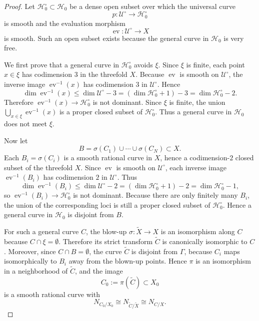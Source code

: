 \documentclass[11pt]{article}
\theoremstyle{definition}
\newcommand{\ev}{\operatorname{ev}}      %
\begin{document}
\begin{proof}
Let $\mathcal H_0^\circ\subset \mathcal H_0$ be a dense open subset over which the
universal curve
\[
p:\mathcal U^\circ\to \mathcal H_0^\circ
\]
is smooth and the evaluation morphism
\[
\ev:\mathcal U^\circ\to X
\]
is smooth. Such an open subset exists because the general curve in
$\mathcal H_0$ is very free.

We first prove that a general curve in $\mathcal H_0^\circ$ avoids $\xi$.
Since $\xi$ is finite, each point $x\in \xi$ has codimension $3$ in the
threefold $X$. Because $\ev$ is smooth on $\mathcal U^\circ$, the inverse image
$\ev^{-1}(x)$ has codimension $3$ in $\mathcal U^\circ$. Hence
\[
\dim \ev^{-1}(x)\le \dim \mathcal U^\circ-3
= (\dim \mathcal H_0^\circ+1)-3
= \dim \mathcal H_0^\circ-2.
\]
Therefore $\ev^{-1}(x)\to \mathcal H_0^\circ$ is not dominant. Since $\xi$ is
finite, the union $\bigcup_{x\in \xi}\ev^{-1}(x)$ is a proper closed subset of
$\mathcal H_0^\circ$. Thus a general curve in $\mathcal H_0$ does not meet
$\xi$.

Now let
\[
B=\sigma(C_1)\cup\cdots\cup\sigma(C_N)\subset X.
\]
Each $B_i=\sigma(C_i)$ is a smooth rational curve in $X$, hence a
codimension-$2$ closed subset of the threefold $X$. Since $\ev$ is smooth on
$\mathcal U^\circ$, each inverse image $\ev^{-1}(B_i)$ has codimension $2$ in
$\mathcal U^\circ$. Thus
\[
\dim \ev^{-1}(B_i)\le \dim \mathcal U^\circ-2
= (\dim \mathcal H_0^\circ+1)-2
= \dim \mathcal H_0^\circ-1,
\]
so $\ev^{-1}(B_i)\to \mathcal H_0^\circ$ is not dominant. Because there are
only finitely many $B_i$, the union of the corresponding loci is still a proper
closed subset of $\mathcal H_0^\circ$. Hence a general curve in $\mathcal H_0$
is disjoint from $B$.

For such a general curve $C$, the blow-up $\sigma:\tilde X\to X$ is an
isomorphism along $C$ because $C\cap \xi=\emptyset$. Therefore its strict
transform $\tilde C$ is canonically isomorphic to $C$. Moreover, since
$C\cap B=\emptyset$, the curve $\tilde C$ is disjoint from $\Gamma$, because
$C_i$ maps isomorphically to $B_i$ away from the blown-up points. Hence
$\pi$ is an isomorphism in a neighborhood of $\tilde C$, and the image
\[
C_0:=\pi(\tilde C)\subset X_0
\]
is a smooth rational curve with
\[
N_{C_0/X_0}\cong N_{\tilde C/\tilde X}\cong N_{C/X}.
\]


\end{proof}
\end{document}
